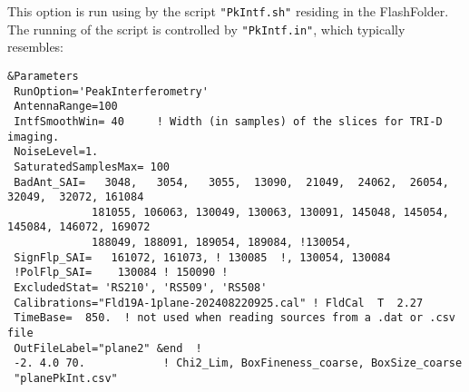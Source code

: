 This option is run using by the script \verb!"PkIntf.sh"! residing in the FlashFolder. The running of the script is controlled by \verb!"PkIntf.in"!, which typically resembles:

\begin{linenumbers}
\resetlinenumber
\tiny
\begin{verbatim}
&Parameters
 RunOption='PeakInterferometry'
 AntennaRange=100
 IntfSmoothWin= 40     ! Width (in samples) of the slices for TRI-D imaging.
 NoiseLevel=1.
 SaturatedSamplesMax= 100
 BadAnt_SAI=   3048,   3054,   3055,  13090,  21049,  24062,  26054,  32049,  32072, 161084
             181055, 106063, 130049, 130063, 130091, 145048, 145054, 145084, 146072, 169072
             188049, 188091, 189054, 189084, !130054,
 SignFlp_SAI=   161072, 161073, ! 130085  !, 130054, 130084
 !PolFlp_SAI=    130084 ! 150090 !
 ExcludedStat= 'RS210', 'RS509', 'RS508'
 Calibrations="Fld19A-1plane-202408220925.cal" ! FldCal  T  2.27
 TimeBase=  850.  ! not used when reading sources from a .dat or .csv file
 OutFileLabel="plane2" &end  !
 -2. 4.0 70.            ! Chi2_Lim, BoxFineness_coarse, BoxSize_coarse
 "planePkInt.csv"
\end{verbatim}
\end{linenumbers}


